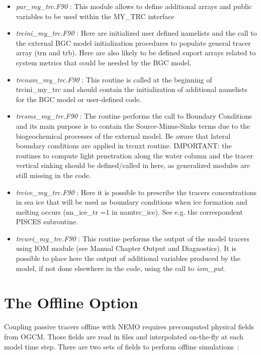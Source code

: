 \documentclass[../main/TOP_manual]{subfiles}
\begin{document}
\begin{itemize}
   \item \textit{par\_my\_trc.F90} :  This module allows to define additional arrays and public variables to be used within the MY\_TRC interface
   \item \textit{trcini\_my\_trc.F90} :  Here are initialized user defined namelists and the call to the external BGC model initialization procedures to populate general tracer array (trn and trb).
Here are also likely to be defined suport arrays related to system metrics that could be needed by the BGC model.
  \item \textit{trcnam\_my\_trc.F90} :  This routine is called at the beginning of trcini\_my\_trc and should contain the initialization of additional namelists for the BGC model or user-defined code.
  \item \textit{trcsms\_my\_trc.F90} :  The routine performs the call to Boundary Conditions and its main purpose is to contain the Source-Minus-Sinks terms due to the biogeochemical processes of the external model.
Be aware that lateral boundary conditions are applied in trcnxt routine.
IMPORTANT: the routines to compute light penetration along the water column and the tracer vertical sinking should be defined/called in here, as generalized modules are still missing in the code.
 \item \textit{trcice\_my\_trc.F90} : Here it is possible to prescribe the tracers concentrations in sea ice that will be used as boundary conditions when ice formation and melting occurs (nn\_ice\_tr =1 in namtrc\_ice).
See e.g. the correspondent PISCES subroutine.
 \item \textit{trcwri\_my\_trc.F90} : This routine performs the output of the model tracers using IOM module (see Manual Chapter Output and Diagnostics).
It is possible to place here the output of additional variables produced by the model, if not done elsewhere in the code, using the call to \textit{iom\_put}.
\end{itemize}

\section{The Offline Option}
\label{Offline}

Coupling passive tracers offline with NEMO requires precomputed physical fields
 from OGCM. Those fields are read in files and interpolated on-the-fly at each model
 time step. There are two sets of fields to perform offline simulations :
\end{document}

